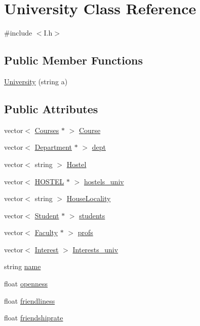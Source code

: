 \hypertarget{classUniversity}{\section{\-University \-Class \-Reference}
\label{classUniversity}
}


{\ttfamily \#include $<$\-I.\-h$>$}

\subsection*{\-Public \-Member \-Functions}
\begin{DoxyCompactItemize}
\item 
\hyperlink{classUniversity_a8126fee108973023f8cdea33f1f67751}{\-University} (string a)
\end{DoxyCompactItemize}
\subsection*{\-Public \-Attributes}
\begin{DoxyCompactItemize}
\item 
vector$<$ \hyperlink{structCourses}{\-Courses} $\ast$ $>$ \hyperlink{classUniversity_ad0feb0908f772456f071a7371f7b0ba7}{\-Course}
\item 
vector$<$ \hyperlink{structDepartment}{\-Department} $\ast$ $>$ \hyperlink{classUniversity_ad26fca6848175651811b3ffea8a3efa5}{dept}
\item 
vector$<$ string $>$ \hyperlink{classUniversity_a1d9f62950f9b15a745c81229297cb2e4}{\-Hostel}
\item 
vector$<$ \hyperlink{structHOSTEL}{\-H\-O\-S\-T\-E\-L} $\ast$ $>$ \hyperlink{classUniversity_abf7a35c654932d72806d1e682a89e5a0}{hostels\-\_\-univ}
\item 
vector$<$ string $>$ \hyperlink{classUniversity_a5573ac275c631e52884ebfad80d3f033}{\-House\-Locality}
\item 
vector$<$ \hyperlink{structStudent}{\-Student} $\ast$ $>$ \hyperlink{classUniversity_a40849f11020c803a8b76241a2931cdcc}{students}
\item 
vector$<$ \hyperlink{structFaculty}{\-Faculty} $\ast$ $>$ \hyperlink{classUniversity_a545e0ef08e2af089af1b21173a0fa3ca}{profs}
\item 
vector$<$ \hyperlink{structInterest}{\-Interest} $>$ \hyperlink{classUniversity_aac51fce221b98b490edb88334e07b322}{\-Interests\-\_\-univ}
\item 
string \hyperlink{classUniversity_a2a8af7dfd2ed7333922f6e2e94cd19a5}{name}
\item 
float \hyperlink{classUniversity_accc4ecb2a9e5f3b4fe0defa51e7aaa7b}{openness}
\item 
float \hyperlink{classUniversity_a181ad9e668561d90f10b66bf854d4ba2}{friendliness}
\item 
float \hyperlink{classUniversity_a5023351ab532628cb001316d80c218d8}{friendshiprate}
\end{DoxyCompactItemize}


